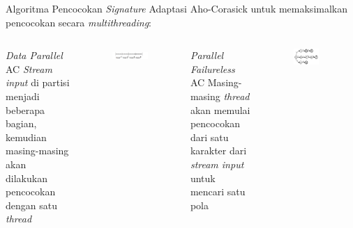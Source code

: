 \documentclass[10pt]{beamer}
\begin{document}
\begin{frame}{Algoritma Pencocokan \emph{Signature}}
    Adaptasi Aho-Corasick untuk memaksimalkan pencocokan secara \emph{multithreading}:
    \begin{columns}[T,onlytextwidth]

            \begin{block}{\emph{Data Parallel} AC}
                \emph{Stream input} di partisi menjadi beberapa bagian, kemudian masing-masing akan dilakukan pencocokan dengan satu \emph{thread}
            \end{block}

            \begin{figure}
                \centering
                \includegraphics[width=1.0\textwidth]{../src/resources/boundary.png}
            \end{figure}
    
    
            \begin{block}{\emph{Parallel Failureless} AC}
                Masing-masing \emph{thread} akan memulai pencocokan dari satu karakter dari \emph{stream input} untuk mencari satu pola
            \end{block}
    
            \begin{figure}
                \centering
                \includegraphics[width=0.7\textwidth]{../src/resources/pfac.png}
            \end{figure}

    \end{columns}
\end{frame}
\end{document}
